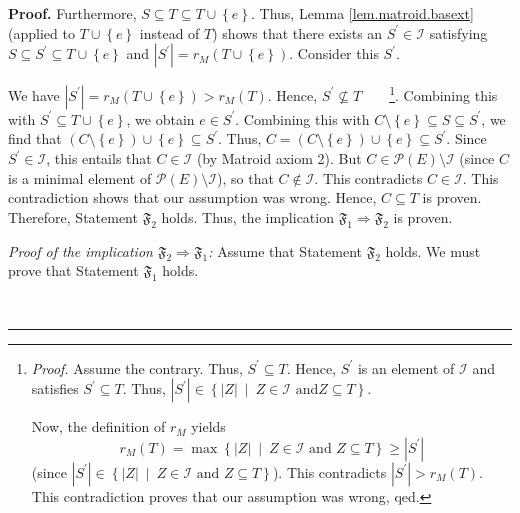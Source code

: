 \documentclass[numbers=enddot,12pt,final,onecolumn,notitlepage]{scrartcl}%
\theoremstyle{definition}
\newenvironment{proof}[1][Proof]{\noindent\textbf{#1.} }{\ \rule{0.5em}{0.5em}}
\begin{document}
\begin{proof}
Furthermore, $S\subseteq T\subseteq T\cup\left\{  e\right\}  $. Thus, Lemma
\ref{lem.matroid.basext} (applied to $T\cup\left\{  e\right\}  $ instead of
$T$) shows that there exists an $S^{\prime}\in\mathcal{I}$ satisfying
$S\subseteq S^{\prime}\subseteq T\cup\left\{  e\right\}  $ and $\left\vert
S^{\prime}\right\vert =r_{M}\left(  T\cup\left\{  e\right\}  \right)  $.
Consider this $S^{\prime}$.

We have $\left\vert S^{\prime}\right\vert =r_{M}\left(  T\cup\left\{
e\right\}  \right)  >r_{M}\left(  T\right)  $. Hence, $S^{\prime
}\not \subseteq T$\ \ \ \ \footnote{\textit{Proof.} Assume the contrary. Thus,
$S^{\prime}\subseteq T$. Hence, $S^{\prime}$ is an element of $\mathcal{I}$
and satisfies $S^{\prime}\subseteq T$. Thus, $\left\vert S^{\prime}\right\vert
\in\left\{  \left\vert Z\right\vert \ \mid\ Z\in\mathcal{I}\text{ and
}Z\subseteq T\right\}  $.
\par
Now, the definition of $r_{M}$ yields%
\[
r_{M}\left(  T\right)  =\max\left\{  \left\vert Z\right\vert \ \mid
\ Z\in\mathcal{I}\text{ and }Z\subseteq T\right\}  \geq\left\vert S^{\prime
}\right\vert
\]
(since $\left\vert S^{\prime}\right\vert \in\left\{  \left\vert Z\right\vert
\ \mid\ Z\in\mathcal{I}\text{ and }Z\subseteq T\right\}  $). This contradicts
$\left\vert S^{\prime}\right\vert >r_{M}\left(  T\right)  $. This
contradiction proves that our assumption was wrong, qed.}. Combining this with
$S^{\prime}\subseteq T\cup\left\{  e\right\}  $, we obtain $e\in S^{\prime}$.
Combining this with $C\setminus\left\{  e\right\}  \subseteq S\subseteq
S^{\prime}$, we find that $\left(  C\setminus\left\{  e\right\}  \right)
\cup\left\{  e\right\}  \subseteq S^{\prime}$. Thus, $C=\left(  C\setminus
\left\{  e\right\}  \right)  \cup\left\{  e\right\}  \subseteq S^{\prime}$.
Since $S^{\prime}\in\mathcal{I}$, this entails that $C\in\mathcal{I}$ (by
Matroid axiom 2). But $C\in\mathcal{P}\left(  E\right)  \setminus\mathcal{I}$
(since $C$ is a minimal element of $\mathcal{P}\left(  E\right)
\setminus\mathcal{I}$), so that $C\notin\mathcal{I}$. This contradicts
$C\in\mathcal{I}$. This contradiction shows that our assumption was wrong.
Hence, $C\subseteq T$ is proven. Therefore, Statement $\mathfrak{F}_{2}$
holds. Thus, the implication $\mathfrak{F}_{1}\Longrightarrow\mathfrak{F}_{2}$
is proven.

\textit{Proof of the implication $\mathfrak{F}_{2}\Longrightarrow
\mathfrak{F}_{1}$:} Assume that Statement $\mathfrak{F}_{2}$ holds. We must
prove that Statement $\mathfrak{F}_{1}$ holds.


\end{proof}
\end{document}
